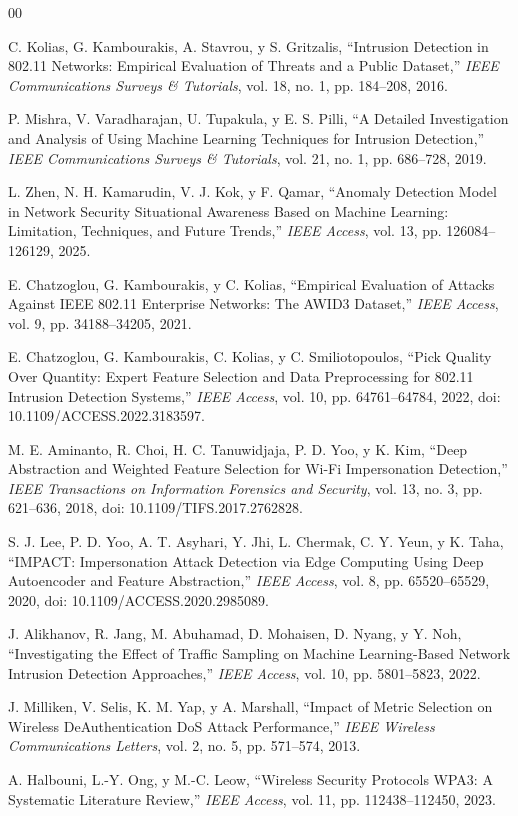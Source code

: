 \documentclass[journal]{IEEEtran}
\begin{document}
\begin{thebibliography}{00}

C. Kolias, G. Kambourakis, A. Stavrou, y S. Gritzalis, ``Intrusion Detection in 802.11 Networks: Empirical Evaluation of Threats and a Public Dataset,'' \textit{IEEE Communications Surveys \& Tutorials}, vol. 18, no. 1, pp. 184--208, 2016.

P. Mishra, V. Varadharajan, U. Tupakula, y E. S. Pilli, ``A Detailed Investigation and Analysis of Using Machine Learning Techniques for Intrusion Detection,'' \textit{IEEE Communications Surveys \& Tutorials}, vol. 21, no. 1, pp. 686--728, 2019.

L. Zhen, N. H. Kamarudin, V. J. Kok, y F. Qamar, ``Anomaly Detection Model in Network Security Situational Awareness Based on Machine Learning: Limitation, Techniques, and Future Trends,'' \textit{IEEE Access}, vol. 13, pp. 126084--126129, 2025.

E. Chatzoglou, G. Kambourakis, y C. Kolias, ``Empirical Evaluation of Attacks Against IEEE 802.11 Enterprise Networks: The AWID3 Dataset,'' \textit{IEEE Access}, vol. 9, pp. 34188--34205, 2021.

E. Chatzoglou, G. Kambourakis, C. Kolias, y C. Smiliotopoulos, ``Pick Quality Over Quantity: Expert Feature Selection and Data Preprocessing for 802.11 Intrusion Detection Systems,'' \textit{IEEE Access}, vol. 10, pp. 64761--64784, 2022, doi: 10.1109/ACCESS.2022.3183597.

M. E. Aminanto, R. Choi, H. C. Tanuwidjaja, P. D. Yoo, y K. Kim, ``Deep Abstraction and Weighted Feature Selection for Wi-Fi Impersonation Detection,'' \textit{IEEE Transactions on Information Forensics and Security}, vol. 13, no. 3, pp. 621--636, 2018, doi: 10.1109/TIFS.2017.2762828.

S. J. Lee, P. D. Yoo, A. T. Asyhari, Y. Jhi, L. Chermak, C. Y. Yeun, y K. Taha, ``IMPACT: Impersonation Attack Detection via Edge Computing Using Deep Autoencoder and Feature Abstraction,'' \textit{IEEE Access}, vol. 8, pp. 65520--65529, 2020, doi: 10.1109/ACCESS.2020.2985089.

J. Alikhanov, R. Jang, M. Abuhamad, D. Mohaisen, D. Nyang, y Y. Noh, ``Investigating the Effect of Traffic Sampling on Machine Learning-Based Network Intrusion Detection Approaches,'' \textit{IEEE Access}, vol. 10, pp. 5801--5823, 2022.

J. Milliken, V. Selis, K. M. Yap, y A. Marshall, ``Impact of Metric Selection on Wireless DeAuthentication DoS Attack Performance,'' \textit{IEEE Wireless Communications Letters}, vol. 2, no. 5, pp. 571--574, 2013.

A. Halbouni, L.-Y. Ong, y M.-C. Leow, ``Wireless Security Protocols WPA3: A Systematic Literature Review,'' \textit{IEEE Access}, vol. 11, pp. 112438--112450, 2023.

\end{thebibliography}
\end{document}

